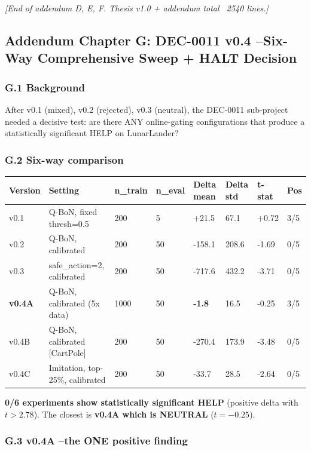 \documentclass[11pt]{article}
\begin{document}
\hrulefill

\textit{[End of addendum D, E, F. Thesis v1.0 + addendum total ~2540 lines.]}


\hrulefill

\subsection{Addendum Chapter G: DEC-0011 v0.4 --Six-Way Comprehensive Sweep + HALT Decision}

\subsubsection{G.1 Background}

After v0.1 (mixed), v0.2 (rejected), v0.3 (neutral), the DEC-0011 sub-project
needed a decisive test: are there ANY online-gating configurations that produce
a statistically significant HELP on LunarLander?

\subsubsection{G.2 Six-way comparison}

\begin{tabular}{llllllll}
Version & Setting & n\_train & n\_eval & Delta mean & Delta std & t-stat & Pos \\
\hline
v0.1 & Q-BoN, fixed thresh=0.5 & 200 & 5 & +21.5 & 67.1 & +0.72 & 3/5 \\
v0.2 & Q-BoN, calibrated & 200 & 50 & -158.1 & 208.6 & -1.69 & 0/5 \\
v0.3 & safe\_action=2, calibrated & 200 & 50 & -717.6 & 432.2 & -3.71 & 0/5 \\
\textbf{v0.4A} & Q-BoN, calibrated (5x data) & 1000 & 50 & \textbf{-1.8} & 16.5 & -0.25 & 3/5 \\
v0.4B & Q-BoN, calibrated [CartPole] & 200 & 50 & -270.4 & 173.9 & -3.48 & 0/5 \\
v0.4C & Imitation, top-25\%, calibrated & 200 & 50 & -33.7 & 28.5 & -2.64 & 0/5 \\
\end{tabular}


\textbf{0/6 experiments show statistically significant HELP} (positive delta with $t > 2.78$). The closest is \textbf{v0.4A which is NEUTRAL} ($t=-0.25$).


\subsubsection{G.3 v0.4A --the ONE positive finding}
\end{document}
